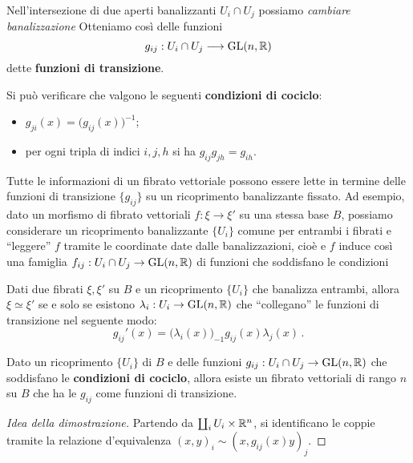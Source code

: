 Nell'intersezione di due aperti banalizzanti $U_{i} \cap U_{j}$ possiamo
\emph{cambiare banalizzazione}
Otteniamo così delle funzioni
\begin{equation*}
	g_{ij} : U_{i} \cap U_{j} \longrightarrow \mathrm{GL}(n,{\mathbb R})
\end{equation*}
dette \textbf{funzioni di transizione}.

\begin{oss}
	Si può verificare che valgono le seguenti \textbf{condizioni di cociclo}:
	\begin{itemize}
		\item $g_{ji}(x) = \big( g_{ij}(x) \big)^{-1}$;
		\item per ogni tripla di indici $i,j,h$ si ha $g_{ij} g_{jh} = g_{ih}$. 
	\end{itemize}
	Tutte le informazioni di un fibrato vettoriale possono essere 
	lette in termine delle funzioni di transizione $\{g_{ij}\}$ su
	un ricoprimento banalizzante fissato. Ad esempio,
	dato un morfismo di fibrato vettoriali $f: \xi \to \xi'$ su una stessa base $B$,
	possiamo considerare un ricoprimento banalizzante $\{U_{i}\}$ comune
	per entrambi i fibrati e ``leggere'' $f$ tramite le coordinate
	date dalle banalizzazioni, cioè
	e $f$ induce così una famiglia $f_{ij}:U_{i} \cap U_{j} \to \mathrm{GL}(n,{\mathbb R})$
	di funzioni che soddisfano le condizioni 
\end{oss}

\begin{thm}
	Dati due fibrati $\xi, \xi'$ su $B$ e un ricoprimento $\{U_{i}\}$ che banalizza entrambi,
	allora $\xi \simeq \xi'$ se e solo se esistono $\lambda_{i}:U_{i} \to \mathrm{GL}(n,{\mathbb R})$
	che ``collegano'' le funzioni di transizione nel seguente modo:
	\begin{equation*}
		g_{ij}'(x) = \big( \lambda_{i}(x) \big)_{-1} g_{ij}(x) \lambda_{j}(x)\,.
	\end{equation*}
\end{thm}

\begin{thm}
	Dato un ricoprimento $\{U_{i}\}$ di $B$ e delle funzioni 
	$g_{ij}:U_{i} \cap U_{j} \to \mathrm{GL}(n,{\mathbb R})$ che soddisfano le \textbf{condizioni di cociclo},
	allora esiste un fibrato vettoriali di rango $n$ su $B$ che ha le $g_{ij}$ come
	funzioni di transizione.
	\begin{proof}[Idea della dimostrazione]
		Partendo da $\coprod_{i} U_{i} \times {\mathbb R}^{n}$,
		si identificano le coppie tramite la relazione d'equivalenza
		$(x,y)_{i} \sim (x,g_{ij}(x)y)_{j}$.
	\end{proof}
\end{thm}

